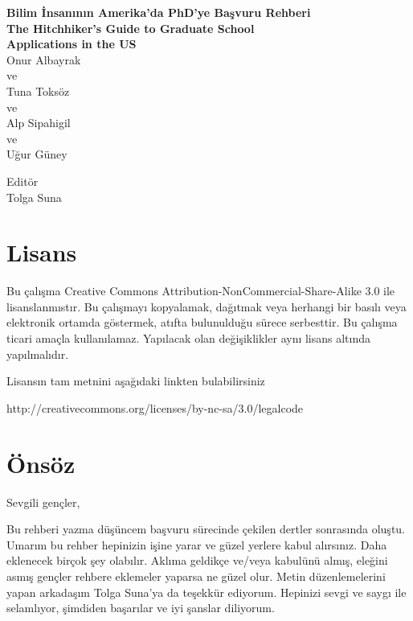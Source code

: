 \documentclass[12pt]{article}
\begin{document}
\thispagestyle{empty}
\setcounter{page}{0}
\begin{center}
\textbf{\Huge{Bilim İnsanının Amerika'da PhD'ye Başvuru Rehberi} \\
\vspace{8mm}
\Large{The Hitchhiker's Guide to Graduate School \\
\vspace{4mm}
Applications in the US }}\\

\vspace{80mm}
\large{Onur Albayrak}
\\
ve 
\\
Tuna Toksöz 
\\
ve 
\\
Alp Sipahigil 
\\
ve 
\\
Uğur Güney \\
\vspace{8mm}

\small{
Editör 
\\
Tolga Suna }
\end{center}

\section*{Lisans}

Bu çalışma Creative Commons Attribution-NonCommercial-Share-Alike 3.0 ile lisanslanmıstır. Bu çalışmayı kopyalamak, dağıtmak veya herhangi bir basılı veya elektronik ortamda göstermek, atıfta bulunulduğu sürece serbesttir. Bu çalışma ticari amaçla kullanılamaz. Yapılacak olan değişiklikler aynı lisans altında yapılmalıdır. 

Lisansın tam metnini aşağıdaki linkten bulabilirsiniz

http://creativecommons.org/licenses/by-nc-sa/3.0/legalcode

\byncsa
\newpage

\tableofcontents
\newpage

%
%
\section{Önsöz}
Sevgili gençler, 

Bu rehberi yazma düşüncem başvuru sürecinde çekilen dertler sonrasında oluştu. Umarım bu rehber hepinizin işine yarar ve güzel yerlere kabul alırsınız. Daha eklenecek birçok şey olabılır. Aklıma geldikçe ve/veya kabulünü almış, eleğini asmış gençler rehbere eklemeler yaparsa ne güzel olur. Metin düzenlemelerini yapan arkadaşım Tolga Suna'ya da teşekkür ediyorum. Hepinizi sevgi ve saygı ile selamlıyor, şimdiden başarılar ve iyi şanslar diliyorum. 
\end{document}
